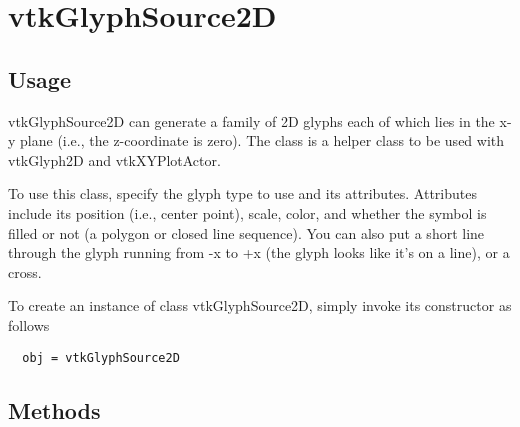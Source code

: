 \section{vtkGlyphSource2D}

\subsection{Usage}

 vtkGlyphSource2D can generate a family of 2D glyphs each of which lies
 in the x-y plane (i.e., the z-coordinate is zero). The class is a helper 
 class to be used with vtkGlyph2D and vtkXYPlotActor.

 To use this class, specify the glyph type to use and its
 attributes. Attributes include its position (i.e., center point), scale,
 color, and whether the symbol is filled or not (a polygon or closed line
 sequence). You can also put a short line through the glyph running from -x
 to +x (the glyph looks like it's on a line), or a cross.

To create an instance of class vtkGlyphSource2D, simply
invoke its constructor as follows
\begin{verbatim}
  obj = vtkGlyphSource2D
\end{verbatim}
\subsection{Methods}

